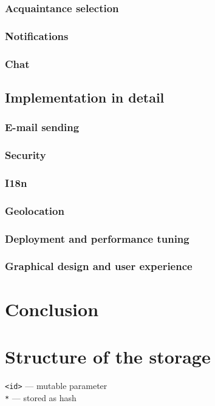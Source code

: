 \documentclass[12pt,oneside]{fithesis}
\begin{document}
	\subsection{Acquaintance selection}
	\subsection{Notifications}
	\subsection{Chat}
\section{Implementation in detail}
	\subsection{E-mail sending}
	\label{section:email}
	\subsection{Security}
	\subsection{I18n}
	\subsection{Geolocation}
	\label{section:geo}
	\subsection{Deployment and performance tuning}
	\subsection{Graphical design and user experience}
\chapter{Conclusion}

\appendix
\chapter{Structure of the storage}
\label{appendix:scheme}
\texttt{<id>} --- mutable parameter\\
\texttt{*} --- stored as hash
\inputminted[fontsize=\footnotesize]{yaml}{scheme.txt}


\end{document}
